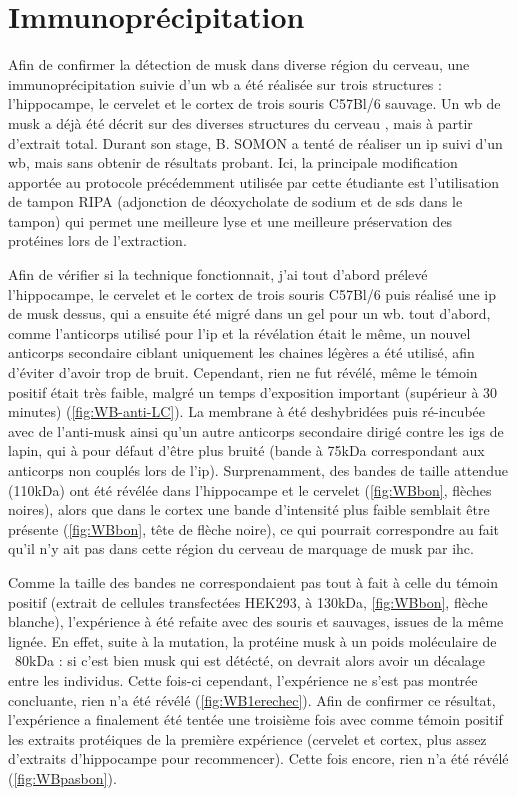 \section{Immunoprécipitation}
\label{sec:IPresultat}
	Afin de confirmer la détection de \gls{musk} dans diverse région du cerveau, une immunoprécipitation suivie d'un \gls{wb} a été réalisée sur trois structures : l'hippocampe, le cervelet et le cortex de trois souris C57Bl/6 sauvage. Un \gls{wb} de \gls{musk} a déjà été décrit sur des diverses structures du cerveau \cite{Garcia-Osta2006}, mais à partir d'extrait total. Durant son stage, B. SOMON a tenté de réaliser un \gls{ip} suivi d'un \gls{wb}, mais sans obtenir de résultats probant. Ici, la principale modification apportée au protocole précédemment utilisée par cette étudiante est l'utilisation de tampon RIPA (adjonction de déoxycholate de sodium et de \acrshort{sds} dans le tampon) qui permet une meilleure lyse et une meilleure préservation des protéines lors de l'extraction.
	
	Afin de vérifier si la technique fonctionnait, j'ai tout d'abord prélevé l'hippocampe, le cervelet et le cortex de trois souris C57Bl/6 puis réalisé une \gls{ip} de \gls{musk} dessus, qui a ensuite été migré dans un gel pour un \gls{wb}. tout d'abord, comme l'anticorps utilisé pour l'\gls{ip} et la révélation était le même, un nouvel anticorps secondaire ciblant uniquement les chaines légères a été utilisé, afin d'éviter d'avoir trop de bruit. Cependant, rien ne fut révélé, même le témoin positif était très faible, malgré un temps d'exposition important (supérieur à 30 minutes) (\cref{fig:WB-anti-LC}). La membrane à été deshybridées puis ré-incubée avec de l'anti-\gls{musk} ainsi qu'un autre anticorps secondaire dirigé contre les \glspl{ig} de lapin, qui à pour défaut d'être plus bruité (bande à 75kDa correspondant aux anticorps non couplés lors de l'\gls{ip}). Surprenamment, des bandes de taille attendue (110kDa) ont été révélée dans l'hippocampe et le cervelet (\cref{fig:WBbon}, flèches noires), alors que dans le cortex une bande d'intensité plus faible semblait être présente (\cref{fig:WBbon}, tête de flèche noire), ce qui pourrait correspondre au fait qu'il n'y ait pas dans cette région du cerveau de marquage de \gls{musk} par \gls{ihc}. 
	
	Comme la taille des bandes ne correspondaient pas tout à fait à celle du témoin positif (extrait de cellules transfectées HEK293, à 130kDa, \cref{fig:WBbon}, flèche blanche), l'expérience à été refaite avec des souris \mcrd et sauvages, issues de la même lignée. En effet, suite à la mutation, la protéine \gls{musk} à un poids moléculaire de ~80kDa : si c'est bien \gls{musk} qui est détécté, on devrait alors avoir un décalage entre les individus. Cette fois-ci cependant, l'expérience ne s'est pas montrée concluante, rien n'a été révélé (\cref{fig:WB1erechec}). Afin de confirmer ce résultat, l'expérience a finalement été tentée une troisième fois avec comme témoin positif les extraits protéiques de la première expérience (cervelet et cortex, plus assez d'extraits d'hippocampe pour recommencer). Cette fois encore, rien n'a été révélé (\cref{fig:WBpasbon}).
	
